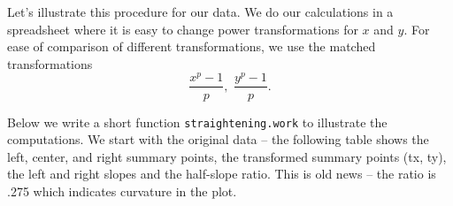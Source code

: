 \documentclass[
]{book}
\newenvironment{Shaded}{\begin{snugshade}}{\end{snugshade}}
\newcommand{\ConstantTok}[1]{\textcolor[rgb]{0.00,0.00,0.00}{#1}}
\newcommand{\ControlFlowTok}[1]{\textcolor[rgb]{0.13,0.29,0.53}{\textbf{#1}}}
\newcommand{\DecValTok}[1]{\textcolor[rgb]{0.00,0.00,0.81}{#1}}
\newcommand{\FunctionTok}[1]{\textcolor[rgb]{0.00,0.00,0.00}{#1}}
\newcommand{\NormalTok}[1]{#1}
\newcommand{\OtherTok}[1]{\textcolor[rgb]{0.56,0.35,0.01}{#1}}
\newcommand{\SpecialCharTok}[1]{\textcolor[rgb]{0.00,0.00,0.00}{#1}}
\newcommand{\StringTok}[1]{\textcolor[rgb]{0.31,0.60,0.02}{#1}}
\begin{document}
Let's illustrate this procedure for our data. We do our calculations in a spreadsheet where it is easy to change power transformations for \(x\) and \(y\). For ease of comparison of different transformations, we use the matched transformations
\[
\frac{x^p - 1}{p}, \, \, \frac{y^p - 1}{p}.
\]

Below we write a short function \texttt{straightening.work}
to illustrate the computations. We start with the original data -- the following table shows the left, center, and right summary points, the transformed summary points (tx, ty), the left and right slopes and the half-slope ratio. This is old news -- the ratio is .275 which indicates curvature in the plot.

\begin{Shaded}
\end{Shaded}
\end{document}
